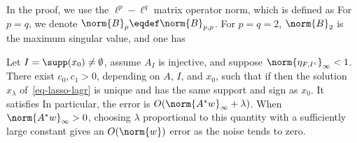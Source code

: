 \begin{rem}\label{rem-operator-norm}
In the proof, we use the $\ell^p-\ell^q$ matrix operator norm, which is defined as
For $p=q$, we denote $\norm{B}_{p} \eqdef \norm{B}_{p,p}$.
%
For $p=q=2$, $\norm{B}_2$ is the maximum singular value, and one has
\end{rem}

\begin{thm}\label{thm-support-stable}
Let $I=\supp(x_0)\neq\emptyset$, assume $A_I$ is injective, and suppose $\norm{\eta_{F,I^c}}_\infty<1$. There exist $c_0,c_1>0$, depending on $A$, $I$, and $x_0$, such that if
then the solution $x_\lambda$ of~\eqref{eq-lasso-lagr} is unique and has the same support and sign as $x_0$. It satisfies
In particular, the error is $O(\norm{A^*w}_\infty+\lambda)$. When $\norm{A^*w}_\infty>0$, choosing $\lambda$ proportional to this quantity with a sufficiently large constant gives an $O(\norm{w})$ error as the noise tends to zero.
\end{thm}

